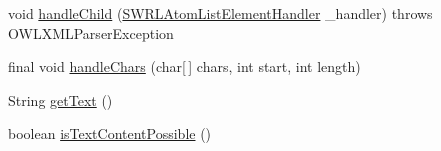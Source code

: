\begin{DoxyCompactItemize}
\item 
void \hyperlink{classorg_1_1coode_1_1owlapi_1_1owlxmlparser_1_1_abstract_o_w_l_element_handler_3_01_o_01_4_a91157301eef4c037ed15ebc1e53999f3}{handle\-Child} (\hyperlink{classorg_1_1coode_1_1owlapi_1_1owlxmlparser_1_1_s_w_r_l_atom_list_element_handler}{S\-W\-R\-L\-Atom\-List\-Element\-Handler} \-\_\-handler)  throws O\-W\-L\-X\-M\-L\-Parser\-Exception 
\item 
final void \hyperlink{classorg_1_1coode_1_1owlapi_1_1owlxmlparser_1_1_abstract_o_w_l_element_handler_3_01_o_01_4_ad33cb20da603df48083b585674fe9e1b}{handle\-Chars} (char\mbox{[}$\,$\mbox{]} chars, int start, int length)
\item 
String \hyperlink{classorg_1_1coode_1_1owlapi_1_1owlxmlparser_1_1_abstract_o_w_l_element_handler_3_01_o_01_4_a62a49f3464b2ac12693e07cd723c470e}{get\-Text} ()
\item 
boolean \hyperlink{classorg_1_1coode_1_1owlapi_1_1owlxmlparser_1_1_abstract_o_w_l_element_handler_3_01_o_01_4_ad8e768e9340ad230e7a5feadab9f3897}{is\-Text\-Content\-Possible} ()
\end{DoxyCompactItemize}
